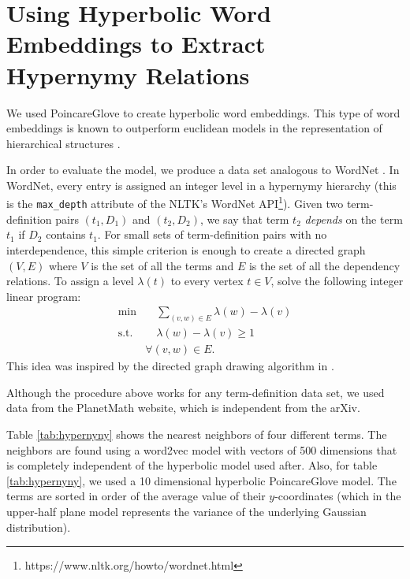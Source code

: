 \documentclass[11pt,a4paper]{article}
\begin{document}
\section{Using Hyperbolic Word Embeddings to Extract Hypernymy Relations}

We used PoincareGlove \cite{tifrea2018poincare} to create hyperbolic
word embeddings. This type of word embeddings is known to outperform
euclidean models in the representation of hierarchical structures \cite{facebookembeds}.

In order to evaluate the model, we produce a data set analogous to
WordNet \cite{wordnet}. In WordNet, every entry
is assigned an integer level in a hypernymy hierarchy (this is the
\texttt{max\_depth} attribute of the NLTK's WordNet
API\footnote{https://www.nltk.org/howto/wordnet.html}). Given two
term-definition pairs $(t_1, D_1)$ and $(t_2, D_2)$, we say that term
$t_2$ \emph{depends} on the term $t_1$ if $D_2$ contains $t_1$.  For
small sets of term-definition pairs with no interdependence, this
simple criterion is enough to create a directed graph $(V, E)$ where
$V$ is the set of all the terms and $E$ is the set of all the
dependency relations. To assign a level $\lambda (t)$ to every 
vertex $t\in V$, solve the following integer linear program:
\begin{align*}
    \text{min} & \quad \sum_{(v,w) \in E} \lambda(w) - \lambda(v)  \\
    \text{s.t.} & \quad \lambda(w) - \lambda(v) \geq 1  \\
     & \forall (v,w) \in E. 
\end{align*}
This idea was inspired by the directed graph drawing algorithm in 
\cite{graphsGasner}. 

Although the procedure above works for any term-definition data set,
we used data from the PlanetMath website, which is independent from 
the arXiv. 

Table \ref{tab:hypernyny} shows the nearest neighbors of four
different terms.  The neighbors are found using a word2vec model with
vectors of 500 dimensions that is completely independent of the
hyperbolic model used after. Also, for table \ref{tab:hypernyny}, we
used a 10 dimensional hyperbolic PoincareGlove model. The terms are 
sorted in order of the average value of their $y$-coordinates (which in
the upper-half plane model represents the variance of the underlying
Gaussian distribution).  
\end{document}
